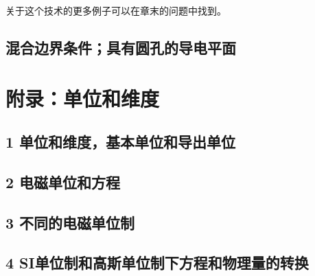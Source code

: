 \documentclass[12pt]{book}
\numberwithin{equation}{chapter}
\numberwithin{figure}{chapter}
\numberwithin{footnote}{page}
\begin{document}
关于这个技术的更多例子可以在章末的问题中找到。

\section{混合边界条件；具有圆孔的导电平面}\label{sec:3.13}


\chapter*{附录：单位和维度}\label{cha:A}
\renewcommand\thesection{\arabic{section}}
\section*{1 单位和维度，基本单位和导出单位}\label{sec:A.1}
\section*{2 电磁单位和方程}\label{sec:A.2}
\section*{3 不同的电磁单位制}\label{sec:A.3}
\section*{4 SI单位制和高斯单位制下方程和物理量的转换}\label{sec:A.4}


\end{document}

